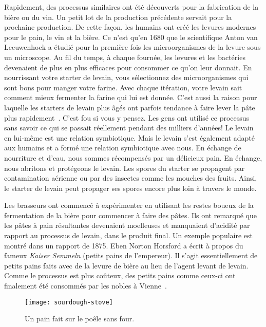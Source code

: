 Rapidement, des processus similaires ont été découverts pour la fabrication de la bière
ou du vin. Un petit lot de la production précédente
servait pour la prochaine production. De cette façon, les humains ont créé
les levures modernes pour le pain, le vin et la bière. Ce n'est qu'en 1680
que le scientifique Anton van Leeuwenhoek a étudié pour la première fois les microorganismes de la levure
sous un microscope. Au fil du temps, à chaque fournée, les levures et les bactéries
devenaient de plus en plus efficaces pour consommer ce qu'on leur donnait.
En nourrissant votre starter de levain, vous sélectionnez
des microorganismes qui sont bons pour manger votre farine. Avec
chaque itération, votre levain sait comment mieux fermenter la farine
qui lui est donnée. C'est aussi la raison pour laquelle les starters de levain plus âgés ont parfois tendance à faire lever la pâte plus rapidement~\cite{review+of+sourdough+starters}. C'est fou si vous
y pensez. Les gens ont utilisé ce processus sans
savoir ce qui se passait réellement pendant des milliers d'années! Le
levain en lui-même est une relation symbiotique. Mais le levain
s'est également adapté aux humains et a formé une relation symbiotique avec nous.
En échange de nourriture et d'eau, nous sommes récompensés par un délicieux pain. En échange,
nous abritons et protégeons le levain. Les spores du starter
se propagent par contamination aérienne ou par des insectes comme les mouches des fruits.
Ainsi, le starter de levain peut propager ses spores
encore plus loin à travers le monde.

Les brasseurs ont commencé à expérimenter en utilisant les restes boueux
de la fermentation de la bière pour commencer à faire des pâtes. Ils ont remarqué
que les pâtes à pain résultantes devenaient moelleuses et manquaient d'acidité par rapport au processus de levain,
dans le produit final.
Un exemple populaire est montré dans un rapport de 1875. Eben Norton Horsford
a écrit à propos du fameux \emph{Kaiser Semmeln} (petits pains de l'empereur).
Il s'agit essentiellement de petits pains faits avec de la levure de bière au lieu
de l'agent levant de levain. Comme le processus est plus coûteux,
des petits pains comme ceux-ci ont finalement été consommés par les nobles
à Vienne~\cite{vienne+petitspains}.

\begin{figure}[ht]
  \texttt{[image: sourdough-stove]}
  \caption{Un pain fait sur le poêle sans four.}%
  \label{sourdough-stove}
\end{figure}

